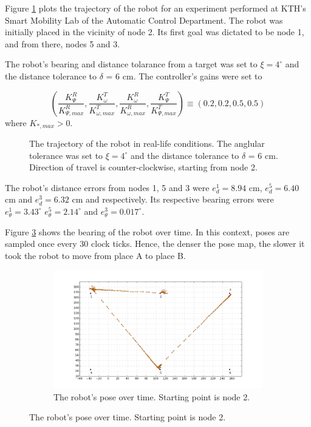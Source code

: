 Figure \ref{fig:22_map_7} plots the trajectory of the robot for an experiment
performed at KTH's Smart Mobility Lab of the Automatic Control Department. The
robot was initially placed in the vicinity of node 2. Its first goal was
dictated to be node 1, and from there, nodes 5 and 3.

The robot's bearing and distance tolarance from a target was set to
$\xi = 4^{\circ}$ and the distance tolerance to $\delta$ = 6 cm. The controller's
gains were set to

$$(\dfrac{K_{\Psi}^R}{K_{\Psi,max}^R}, \dfrac{K_{\omega}^T}{K_{\omega, max}^T}, \dfrac{K_{\omega}^R}{K_{\omega,max}^R}, \dfrac{K_{\Psi}^T}{K_{\Psi,max}^T})
\equiv (0.2, 0.2, 0.5, 0.5)$$
where $K_{*,max} > 0$.

\begin{figure}\centering
  \scalebox{1}{}
  \caption{The trajectory of the robot in real-life conditions. The anglular
    tolerance was set to $\xi = 4^{\circ}$ and the distance tolerance to
    $\delta$ = 6 cm. Direction of travel is counter-clockwise, starting from node 2.}
  \label{fig:22_map_7}
\end{figure}

The robot's distance errors from nodes 1, 5 and 3 were $e_d^1 = 8.94$ cm,
$e_d^5 = 6.40$ cm and $e_d^3 = 6.32$ cm and respectively. Its respective bearing
errors were $e_{\theta}^1 = 3.43^{\circ}$ $e_{\theta}^5 = 2.14^{\circ}$ and
$e_{\theta}^3 = 0.017^{\circ}$.

Figure \ref{fig:22_map_plus_bearing} shows the bearing of the robot over time.
In this context, poses are sampled once every 30 clock ticks. Hence, the denser
the pose map, the slower it took the robot to move from place A to place B.

\begin{figure}
  \begin{figure}[H]\centering
      \includegraphics[scale=0.9]{./figures/task_22/figure_test.png}
      \caption{The robot's pose over time. Starting point is node 2.}
      \label{fig:22_map_plus_bearing}
    \end{figure}
\end{figure}

